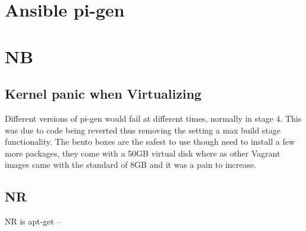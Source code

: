 \documentclass[12pt,a4paper]{report}
\begin{document}
\chapter{Ansible pi-gen}

\chapter{NB}
\section{Kernel panic when Virtualizing}
Different versions of pi-gen would fail at different times, normally in stage 4. This was due to code being reverted thus removing the setting a max build stage functionality. The bento boxes are the safest to use though need to install a few more packages, they come with a 50GB virtual disk where as other Vagrant images came with the standard of 8GB and it was a pain to increase. 
\section{NR}
NR is apt-get --
\end{document}
